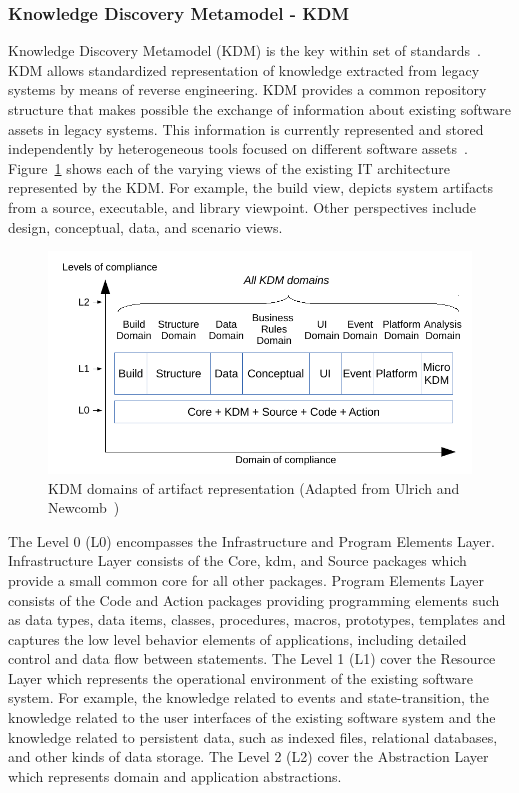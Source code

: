 \subsubsection{Knowledge Discovery Metamodel - KDM}\label{subsec:KDM}

Knowledge Discovery Metamodel (KDM) is the key within set of standards~\cite{1686216}. KDM allows standardized representation of knowledge extracted from legacy systems by means of reverse engineering. KDM provides a common repository structure that makes possible the exchange of information about existing software assets in legacy systems. This information is currently represented and stored independently by heterogeneous tools focused on different software assets~\cite[p.~32]{Ulrich:2010:IST:1841736}. Figure~\ref{kdm} shows each of the varying views of the existing IT architecture represented by the KDM. For example, the build view, depicts system artifacts from a source, executable, and library viewpoint. Other perspectives include design, conceptual, data, and scenario views.

\begin{figure}[!ht]
\centering
  \includegraphics[scale=0.67]{figuras/kdm}
\caption{KDM domains of artifact representation (Adapted from Ulrich and Newcomb~\cite{Ulrich:2010:IST:1841736})}
\label{kdm}
\end{figure}

The Level 0 (L0) encompasses the Infrastructure and Program Elements Layer. Infrastructure Layer consists of the Core, kdm, and Source packages which provide a small common core for all other packages. Program Elements Layer consists of the Code and Action packages providing programming elements such as  data types, data items, classes, procedures, macros, prototypes, templates and captures the low level behavior elements of applications, including detailed control and data flow between statements. The Level 1 (L1) cover the Resource Layer which represents the operational environment of the existing software system. For example, the knowledge related to events and state-transition, the knowledge related to the user interfaces of the existing software system and the knowledge related to persistent data, such as indexed files, relational databases, and other kinds of data storage. The Level 2 (L2) cover the Abstraction Layer which represents domain and application abstractions. 

